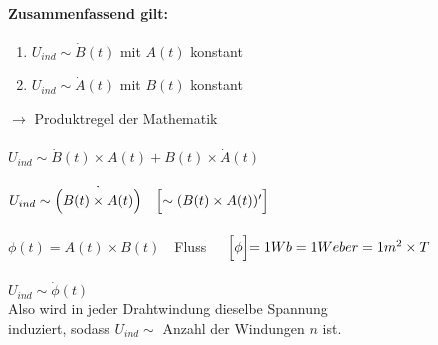 \documentclass{report}
\begin{document}
		\paragraph{Zusammenfassend gilt:}
		
		\begin{enumerate}
			\item $U_{ind} \sim \dot B(t)$ mit $A(t)$ konstant
			\item $U_{ind} \sim \dot A(t)$ mit $B(t)$ konstant
		\end{enumerate}
		$\to$ Produktregel der Mathematik \\\\
		$U_{ind} \sim \dot B(t) \times A(t) + B(t) \times \dot A(t)$ \\\\
		$U_{ind} \sim \dot{\Bigl(B(t) \times A(t)\Bigl)}\ \ \ \Bigl[\sim (B(t) \times A(t))'\Bigl]$ \\\\
		$\phi(t) = A(t) \times B(t)$\ \ \dq Fluss\dq\ \ \ $\Bigl[\phi\Bigl] = 1Wb = 1 Weber = 1m^2 \times T$ \\
		\\ $U_{ind} \sim \dot \phi(t)$
		\\[3cm]
		Also wird in jeder Drahtwindung dieselbe Spannung \\induziert, sodass $U_{ind} \sim $ Anzahl der Windungen $n$ ist.
\end{document}
